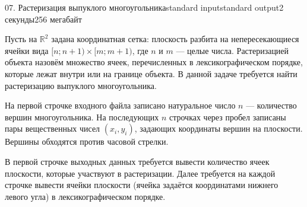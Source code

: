 \begin{problem}{07. Растеризация выпуклого многоугольника}{standard input}{standard output}{2 секунды}{256 мегабайт}

Пусть на $\mathbb R^2$ задана координатная сетка: плоскость разбита на непересекающиеся ячейки вида $[n; n + 1) \times [m; m + 1)$, где $n$ и $m$ --- целые числа. Растеризацией объекта назовём множество ячеек, перечисленных в лексикографическом порядке, которые лежат внутри или на границе объекта. В данной задаче требуется найти растеризацию выпуклого многоугольника.

\InputFile

На первой строчке входного файла записано натуральное число $n$ --- количество вершин многоугольника. На последующих $n$ строчках через пробел записаны пары вещественных чисел $(x_i, y_i)$, задающих координаты вершин на плоскости. Вершины обходятся против часовой стрелки.

\OutputFile

В первой строчке выходных данных требуется вывести количество ячеек плоскости, которые участвуют в растеризации. Далее требуется на каждой строчке вывести ячейки плоскости (ячейка задаётся координатами нижнего левого угла) в лексикографическом порядке.

\Examples

\begin{example}%
%
\end{example}

\end{problem}
